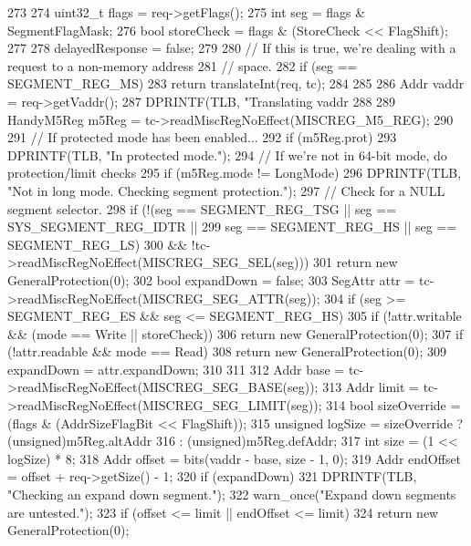 \begin{DoxyCode}
273 {
274     uint32_t flags = req->getFlags();
275     int seg = flags & SegmentFlagMask;
276     bool storeCheck = flags & (StoreCheck << FlagShift);
277 
278     delayedResponse = false;
279 
280     // If this is true, we're dealing with a request to a non-memory address
281     // space.
282     if (seg == SEGMENT_REG_MS) {
283         return translateInt(req, tc);
284     }
285 
286     Addr vaddr = req->getVaddr();
287     DPRINTF(TLB, "Translating vaddr %
288 
289     HandyM5Reg m5Reg = tc->readMiscRegNoEffect(MISCREG_M5_REG);
290 
291     // If protected mode has been enabled...
292     if (m5Reg.prot) {
293         DPRINTF(TLB, "In protected mode.\n");
294         // If we're not in 64-bit mode, do protection/limit checks
295         if (m5Reg.mode != LongMode) {
296             DPRINTF(TLB, "Not in long mode. Checking segment protection.\n");
297             // Check for a NULL segment selector.
298             if (!(seg == SEGMENT_REG_TSG || seg == SYS_SEGMENT_REG_IDTR ||
299                         seg == SEGMENT_REG_HS || seg == SEGMENT_REG_LS)
300                     && !tc->readMiscRegNoEffect(MISCREG_SEG_SEL(seg)))
301                 return new GeneralProtection(0);
302             bool expandDown = false;
303             SegAttr attr = tc->readMiscRegNoEffect(MISCREG_SEG_ATTR(seg));
304             if (seg >= SEGMENT_REG_ES && seg <= SEGMENT_REG_HS) {
305                 if (!attr.writable && (mode == Write || storeCheck))
306                     return new GeneralProtection(0);
307                 if (!attr.readable && mode == Read)
308                     return new GeneralProtection(0);
309                 expandDown = attr.expandDown;
310 
311             }
312             Addr base = tc->readMiscRegNoEffect(MISCREG_SEG_BASE(seg));
313             Addr limit = tc->readMiscRegNoEffect(MISCREG_SEG_LIMIT(seg));
314             bool sizeOverride = (flags & (AddrSizeFlagBit << FlagShift));
315             unsigned logSize = sizeOverride ? (unsigned)m5Reg.altAddr
316                                             : (unsigned)m5Reg.defAddr;
317             int size = (1 << logSize) * 8;
318             Addr offset = bits(vaddr - base, size - 1, 0);
319             Addr endOffset = offset + req->getSize() - 1;
320             if (expandDown) {
321                 DPRINTF(TLB, "Checking an expand down segment.\n");
322                 warn_once("Expand down segments are untested.\n");
323                 if (offset <= limit || endOffset <= limit)
324                     return new GeneralProtection(0);
}}}}
\end{DoxyCode}
